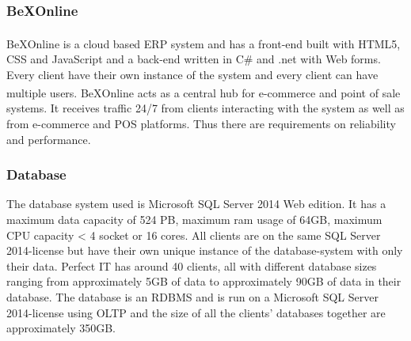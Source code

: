 \documentclass{cslthse-msc}
\newcommand{\bex}{BeX\textsuperscript{\textregistered}}
\begin{document}
\subsubsection{\bex Online}
\bex Online is a cloud based ERP system and has a front-end built with HTML5, CSS and JavaScript and a back-end written in C\# and .net with Web forms.
Every client have their own instance of the system and every client can have multiple users. \bex Online acts as a central hub for e-commerce and point of sale systems. It receives traffic 24/7 from clients interacting with the system as well as from e-commerce and POS platforms. Thus there are requirements on reliability and performance.

\subsubsection{Database}
The database system used is Microsoft SQL Server 2014 Web edition. It has a maximum data capacity of 524 PB, maximum ram usage of 64GB, maximum CPU capacity < 4 socket or 16 cores. All clients are on the same SQL Server 2014-license but have their own unique instance of the database-system with only their data.  Perfect IT has around 40 clients, all with different database sizes ranging from approximately 5GB of data to approximately 90GB of data in their database. The database is an RDBMS and is run on a Microsoft SQL Server 2014-license using OLTP and the size of all the clients' databases together are approximately 350GB.
\end{document}
